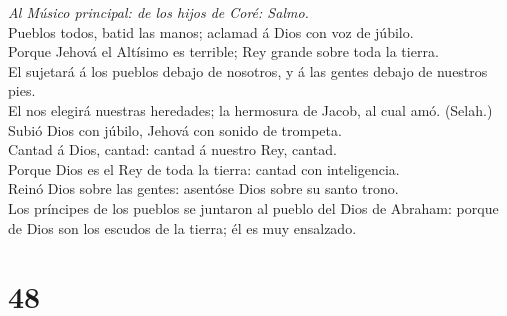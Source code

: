  \emph{Al Músico principal: de los hijos de Coré: Salmo.}\\
Pueblos todos, batid las manos; aclamad á Dios con voz de júbilo.\\
 Porque Jehová el Altísimo es terrible; Rey grande sobre
toda la tierra.\\
 El sujetará á los pueblos debajo de nosotros, y á las
gentes debajo de nuestros pies.\\
 El nos elegirá nuestras heredades; la hermosura de Jacob,
al cual amó. (Selah.)\\
 Subió Dios con júbilo, Jehová con sonido de trompeta.\\
 Cantad á Dios, cantad: cantad á nuestro Rey, cantad.\\
 Porque Dios es el Rey de toda la tierra: cantad con
inteligencia.\\
 Reinó Dios sobre las gentes: asentóse Dios sobre su santo
trono.\\
 Los príncipes de los pueblos se juntaron al pueblo del Dios
de Abraham: porque de Dios son los escudos de la tierra; él es muy
ensalzado.

\hypertarget{section-47}{%
\section{48}\label{section-47}}

